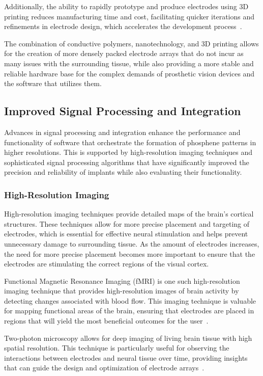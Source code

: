 \documentclass[twocolumn,10pt]{article}
\begin{document}
Additionally, the ability to rapidly prototype and produce electrodes using 3D
printing reduces manufacturing time and cost, facilitating quicker iterations
and refinements in electrode design, which accelerates the development
process~\parencite{zhangClimbinginspiredTwiningElectrodes2019}.

The combination of conductive polymers, nanotechnology, and 3D printing allows
for the creation of more densely packed electrode arrays that do not incur as
many issues with the surrounding tissue, while also providing a more stable and
reliable hardware base for the complex demands of prosthetic vision devices and
the software that utilizes them.

\subsection*{Improved Signal Processing and Integration}
Advances in signal processing and integration enhance the performance and
functionality of software that orchestrate the formation of phosphene patterns
in higher resolutions. This is supported by high-resolution imaging techniques
and sophisticated signal processing algorithms that have significantly improved
the precision and reliability of implants while also evaluating their functionality.

\subsubsection*{High-Resolution Imaging}
High-resolution imaging techniques provide detailed maps of the brain's cortical
structures. These techniques allow for more precise placement and targeting of
electrodes, which is essential for effective neural stimulation and helps
prevent unnecessary damage to surrounding tissue. As the amount of electrodes
increases, the need for more precise placement becomes more important to ensure
that the electrodes are stimulating the correct regions of the visual cortex.

Functional Magnetic Resonance Imaging (fMRI) is one such high-resolution imaging
technique that provides high-resolution images of
brain activity by detecting changes associated with blood flow. This imaging
technique is valuable for mapping functional areas of the brain, ensuring that
electrodes are placed in regions that will yield the most beneficial outcomes
for the user~\parencite{landelleInvestigatingHumanSpinal2021}.

Two-photon microscopy allows for deep imaging of living brain tissue with high
spatial resolution. This technique is particularly useful for observing the
interactions between electrodes and neural tissue over time, providing insights
that can guide the design and optimization of electrode
arrays~\parencite{yangIntegratedMicroprismMicroelectrode2024}.
\end{document}
